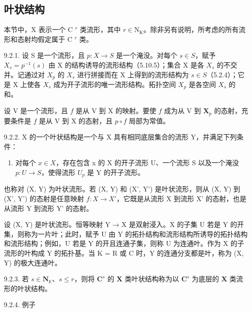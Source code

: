 \subsection{叶状结构}

本节中，X 表示一个 C \(^{r}\) 类流形，其中 \(r \in \mathrm{N}_{\mathrm{K}}\)。除非另有说明，所考虑的所有流形和态射均假定属于 C \(^{r}\) 类。

9.2.1. 设 S 是一个流形，且 \(p: X \to S\) 是一个淹没。对每个 \(s \in S\)，赋予 \(X_s = p^{-1}(s)\) 由 X 的结构诱导的流形结构（5.10.5）；集合 X 是各 \(X_s\) 的不交并。记通过对 \(X_p\) 的 \(X_s\) 进行拼接而在 X 上得到的流形结构为 \(s \in S\)（5.2.4）；它是 X 上使各 \(X_s\) 成为开子流形的唯一流形结构。拓扑空间 \(X_p\) 是各空间 \(X_s\) 的和。

设 V 是一个流形，且 \(f\) 是从 V 到 X 的映射。要使 \(f\) 成为从 V 到 \(\mathbf{X}_{p}\) 的态射，充要条件是 \(f\) 是从 V 到 X 的态射，且 \(p \circ f\) 局部为常值。

9.2.2. X 的一个叶状结构是一个与 X 具有相同底层集合的流形 Y，并满足下列条件：

\begin{enumerate}
\def\labelenumi{(\Alph{enumi})}
\setcounter{enumi}{5}
\tightlist
\item
  对每个 \(x \in X\)，存在包含 x 的 X 的开子流形 U、一个流形 S 以及一个淹没 \(p: U \to S\)，使得流形 \(U_{p}\) 是 Y 的开子流形。
\end{enumerate}

也称对 (X, Y) 为叶状流形。若 (X, Y) 和 (X', Y') 是叶状流形，则从 (X, Y) 到 (X', Y') 的态射是任意映射 \(f: X \to X'\)，它既是从流形 X 到流形 X' 的态射，也是从流形 Y 到流形 Y' 的态射。

设 (X, Y) 是叶状流形。恒等映射 Y → X 是双射浸入。X 的子集 U 若是 Y 的开集，则称为一片叶；此时，赋予 U 由 Y 的拓扑结构和流形结构所诱导的拓扑结构和流形结构；例如，U 若是 Y 的开且连通子集，则称 U 为连通叶。作为 X 的子流形的叶构成 Y 的拓扑基。当 K = R 或 C 时，Y 的连通分支都是叶，称为 (X, Y) 的极大连通叶。

9.2.3. 若 \(s \in \mathbf{N}_{\mathbb{K}}\)、\(s \leqslant r\)，则将 \(\mathbf{C}^s\) 的 \(\mathbf{X}\) 类叶状结构称为以 \(\mathbf{C}^s\) 为底层的 \(\mathbf{X}\) 类流形的叶状结构。

9.2.4. 例子

